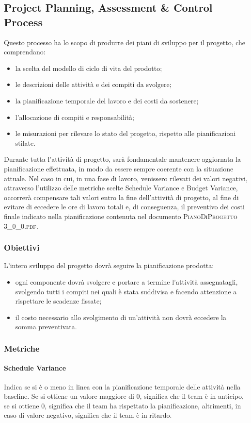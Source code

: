 	\subsection{Project Planning, Assessment \& Control Process}
	Questo processo ha lo scopo di produrre dei piani di sviluppo per il progetto, che comprendano:
	\begin{itemize}
		\item la scelta del modello di ciclo di vita del prodotto;
		\item le descrizioni delle attività e dei compiti da svolgere;
		\item la pianificazione temporale del lavoro e dei costi da sostenere;
		\item l'allocazione di compiti e responsabilità;
		\item le misurazioni per rilevare lo stato del progetto, rispetto alle pianificazioni stilate.
	\end{itemize}
	Durante tutta l’attività di	progetto, sarà fondamentale mantenere aggiornata la pianificazione effettuata, in modo da essere sempre coerente con la situazione attuale. Nel caso in cui, in una fase di lavoro, venissero rilevati dei valori negativi, attraverso l'utilizzo delle metriche scelte Schedule Variance e Budget Variance, occorrerà compensare tali valori entro la fine dell’attività di progetto, al fine di evitare di eccedere le ore di lavoro totali e, di conseguenza, il preventivo dei costi finale indicato nella pianificazione contenuta nel documento \textsc{PianoDiProgetto 3\_0\_0.pdf}.
		\subsubsection{Obiettivi}
		L’intero sviluppo del progetto dovrà seguire la pianificazione prodotta:
		\begin{itemize}
			\item ogni componente dovrà svolgere e portare a termine l'attività assegnatagli, svolgendo tutti i compiti nei quali è stata suddivisa e facendo attenzione a rispettare le scadenze fissate;
			\item il costo necessario allo svolgimento di un'attività non dovrà eccedere la somma
			preventivata.
		\end{itemize}
		\subsubsection{Metriche}
			\paragraph{Schedule Variance}
			Indica se si è o meno in linea con la pianificazione temporale delle attività nella baseline.
			Se si ottiene un valore maggiore di 0, significa che il team è in anticipo, se si ottiene 0, significa che il team ha rispettato la pianificazione, altrimenti, in caso di valore negativo, significa che il team è in ritardo.
			
